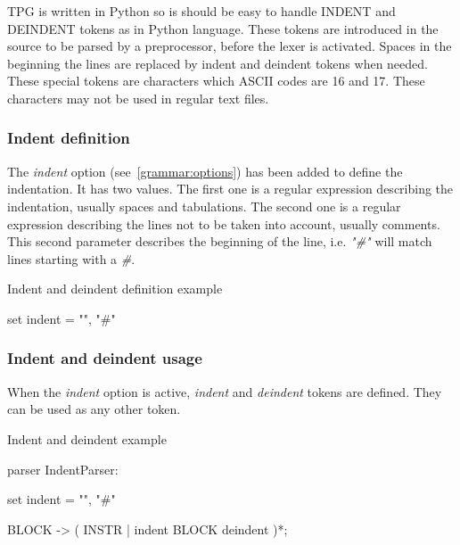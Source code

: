 TPG is written in Python so is should be easy to handle INDENT and DEINDENT tokens as in Python language.
These tokens are introduced in the source to be parsed by a preprocessor, before the lexer is activated.
Spaces in the beginning the lines are replaced by indent and deindent tokens when needed.
These special tokens are characters which ASCII codes are 16 and 17.
These characters may not be used in regular text files.

\subsubsection{Indent definition}

The \emph{indent} option (see~\ref{grammar:options}) has been added to define the indentation.
It has two values.
The first one is a regular expression describing the indentation, usually spaces and tabulations.
The second one is a regular expression describing the lines not to be taken into account, usually comments.
This second parameter describes the beginning of the line, i.e. \emph{"\#"} will match lines starting
with a \emph{\#}.

\begin{code}
\caption{Indent and deindent definition example}            \label{lexer:indent_definition}
\begin{verbatimtab}[4]
    set indent = "\s", "#"
\end{verbatimtab}
\end{code}

\subsubsection{Indent and deindent usage}                   \label{lexer:indent_usage}

When the \emph{indent} option is active, \emph{indent} and \emph{deindent} tokens are defined.
They can be used as any other token.

\begin{code}
\caption{Indent and deindent example}            \label{lexer:indent_example}
\begin{verbatimtab}[4]
parser IndentParser:

    set indent = "\s", "#"

    BLOCK ->
        (   INSTR
        |   indent
                BLOCK
            deindent
        )*;
\end{verbatimtab}
\end{code}
